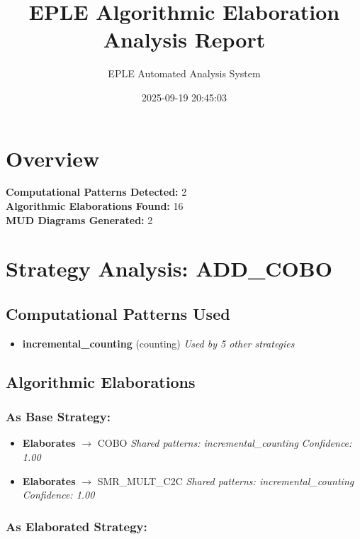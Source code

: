 \documentclass{article}
\title{EPLE Algorithmic Elaboration Analysis Report}
\date{2025-09-19 20:45:03}
\author{EPLE Automated Analysis System}
\begin{document}
\maketitle

\section{Overview}

\textbf{Computational Patterns Detected:} 2\\
\textbf{Algorithmic Elaborations Found:} 16\\
\textbf{MUD Diagrams Generated:} 2\\

\section{Strategy Analysis: ADD\_COBO}

\subsection{Computational Patterns Used}

\begin{itemize}
\item \textbf{incremental\_counting} (counting)
  \textit{Used by 5 other strategies}
\end{itemize}

\subsection{Algorithmic Elaborations}

\subsubsection{As Base Strategy:}

\begin{itemize}
\item \textbf{Elaborates} $\rightarrow$ COBO
  \textit{Shared patterns: incremental\_counting}
  \textit{Confidence: 1.00}

\item \textbf{Elaborates} $\rightarrow$ SMR\_MULT\_C2C
  \textit{Shared patterns: incremental\_counting}
  \textit{Confidence: 1.00}

\end{itemize}

\subsubsection{As Elaborated Strategy:}
\end{document}
